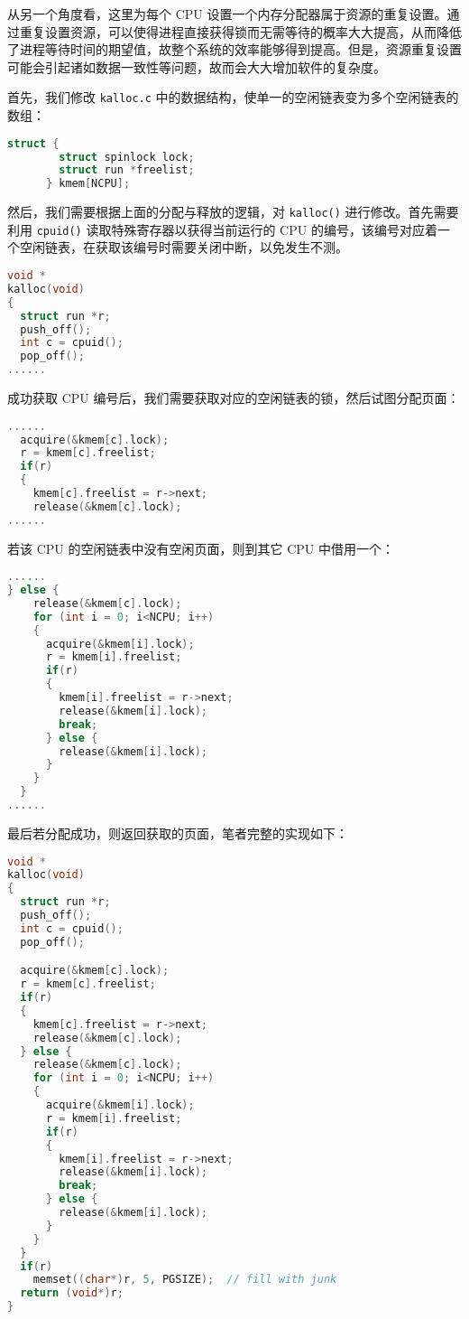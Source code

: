 \begin{proposition}[资源重复设置与减小加锁开销] 
    从另一个角度看，这里为每个 CPU 设置一个内存分配器属于资源的重复设置。通过重复设置资源，可以使得进程直接获得锁而无需等待的概率大大提高，从而降低了进程等待时间的期望值，故整个系统的效率能够得到提高。但是，资源重复设置可能会引起诸如数据一致性等问题，故而会大大增加软件的复杂度。
\end{proposition}

首先，我们修改 \lstinline{kalloc.c} 中的数据结构，使单一的空闲链表变为多个空闲链表的数组：
\begin{lstlisting}[language=C]
    struct {
        struct spinlock lock;
        struct run *freelist;
      } kmem[NCPU];
\end{lstlisting}

然后，我们需要根据上面的分配与释放的逻辑，对 \lstinline{kalloc()} 进行修改。首先需要利用 \lstinline{cpuid()} 读取特殊寄存器以获得当前运行的 CPU 的编号，该编号对应着一个空闲链表，在获取该编号时需要关闭中断，以免发生不测。
\begin{lstlisting}[language=C]
void *
kalloc(void)
{
  struct run *r;
  push_off();
  int c = cpuid();
  pop_off();
......
\end{lstlisting}

成功获取 CPU 编号后，我们需要获取对应的空闲链表的锁，然后试图分配页面：
\begin{lstlisting}[language=C]
......
  acquire(&kmem[c].lock);
  r = kmem[c].freelist;
  if(r)
  {
    kmem[c].freelist = r->next;
    release(&kmem[c].lock);
......
\end{lstlisting}

若该 CPU 的空闲链表中没有空闲页面，则到其它 CPU 中借用一个：
\begin{lstlisting}[language=C]
......
} else {
    release(&kmem[c].lock);
    for (int i = 0; i<NCPU; i++)
    {
      acquire(&kmem[i].lock);
      r = kmem[i].freelist;
      if(r)
      {
        kmem[i].freelist = r->next;
        release(&kmem[i].lock);
        break;
      } else {
        release(&kmem[i].lock);
      }
    }
  }
......
\end{lstlisting}

最后若分配成功，则返回获取的页面，笔者完整的实现如下：
\begin{lstlisting}[language=C]
void *
kalloc(void)
{
  struct run *r;
  push_off();
  int c = cpuid();
  pop_off();

  acquire(&kmem[c].lock);
  r = kmem[c].freelist;
  if(r)
  {
    kmem[c].freelist = r->next;
    release(&kmem[c].lock);
  } else {
    release(&kmem[c].lock);
    for (int i = 0; i<NCPU; i++)
    {
      acquire(&kmem[i].lock);
      r = kmem[i].freelist;
      if(r)
      {
        kmem[i].freelist = r->next;
        release(&kmem[i].lock);
        break;
      } else {
        release(&kmem[i].lock);
      }
    }
  }
  if(r)
    memset((char*)r, 5, PGSIZE);  // fill with junk
  return (void*)r;
}
\end{lstlisting}

